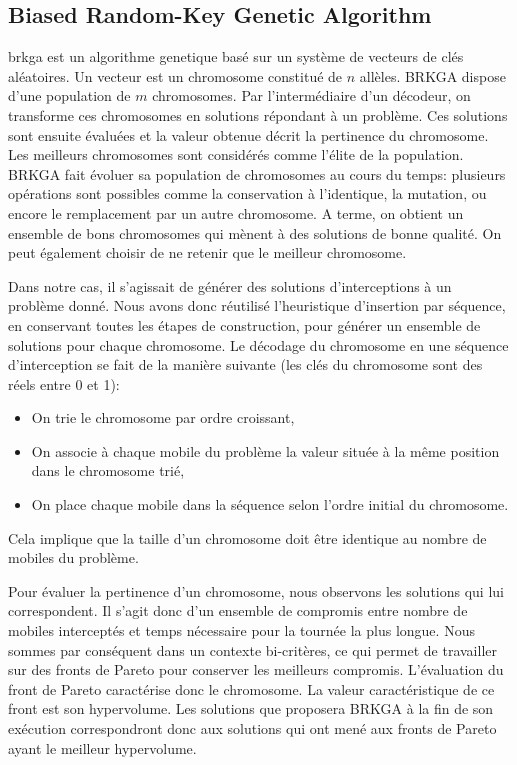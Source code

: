 		\subsection{Biased Random-Key Genetic Algorithm}
			\Gls{brkga} est un \gls{algorithme genetique} basé sur un système de vecteurs de clés aléatoires. Un vecteur est un chromosome constitué de $n$ allèles. BRKGA dispose d'une population de $m$ chromosomes. Par l'intermédiaire d'un décodeur, on transforme ces chromosomes en solutions répondant à un problème. Ces solutions sont ensuite évaluées et la valeur obtenue décrit la pertinence du chromosome. Les meilleurs chromosomes sont considérés comme l'élite de la population. BRKGA fait évoluer sa population de chromosomes au cours du temps: plusieurs opérations sont possibles comme la conservation à l'identique, la mutation, ou encore le remplacement par un autre chromosome. A terme, on obtient un ensemble de bons chromosomes qui mènent à des solutions de bonne qualité. On peut également choisir de ne retenir que le meilleur chromosome.

			Dans notre cas, il s'agissait de générer des solutions d'interceptions à un problème donné. Nous avons donc réutilisé l'heuristique d'insertion par séquence, en conservant toutes les étapes de construction, pour générer un ensemble de solutions pour chaque chromosome.
			Le décodage du chromosome en une séquence d'interception se fait de la manière suivante (les clés du chromosome sont des réels entre 0 et 1):
			\begin{itemize}
				\item On trie le chromosome par ordre croissant,
				\item On associe à chaque mobile du problème la valeur située à la même position dans le chromosome trié,
				\item On place chaque mobile dans la séquence selon l'ordre initial du chromosome.
			\end{itemize}
			Cela implique que la taille d'un chromosome doit être identique au nombre de mobiles du problème.

			Pour évaluer la pertinence d'un chromosome, nous observons les solutions qui lui correspondent. Il s'agit donc d'un ensemble de compromis entre nombre de mobiles interceptés et temps nécessaire pour la tournée la plus longue. Nous sommes par conséquent dans un contexte bi-critères, ce qui permet de travailler sur des fronts de Pareto pour conserver les meilleurs compromis. L'évaluation du front de Pareto caractérise donc le chromosome. La valeur caractéristique de ce front est son hypervolume. Les solutions que proposera BRKGA à la fin de son exécution correspondront donc aux solutions qui ont mené aux fronts de Pareto ayant le meilleur hypervolume.

